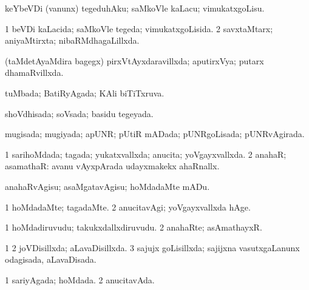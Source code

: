{\bentry
{} 
\gl{\sakirx}
\expl{}
\bmng
 keYbeVDi (\mo vanunx) tegeduhAku; saMkoVle kaLacu; vimukatxgoLisu. 
\emng
\eentry

\bentry
{} 
\gl{\gu}
\expl{}
\bmng
\bnum
\num{1} beVDi kaLacida; saMkoVle tegeda; vimukatxgoLisida. 
\num{2} savxtaMtarx; aniyaMtirxta; nibaRMdhagaLillxda. 
\enum
\emng
\eentry

\bentry
{} 
\gl{\gu}
\expl{}
\bmng
 (taMdetAyaMdira bagegx) pirxVtAyxdaravillxda; aputirxVya; putarx dhamaRvillxda. 
\emng
\eentry

\bentry
{} 
\gl{\gu}
\expl{}
\bmng
 tuMbada; BatiRyAgada; KAli biTiTxruva. 
\emng
\eentry

\bentry
{} 
\gl{\gu}
\expl{}
\bmng
 shoVdhisada; soVsada; basidu tegeyada. 
\emng
\eentry

\bentry
{} 
\gl{\gu}
\expl{}
\bmng
mugisada; mugiyada; apUNR; pUtiR mADada; pUNRgoLisada; pUNRvAgirada. 
\emng
\eentry

\bentry
{} 
\gl{\gu}
\expl{}
\bmng
\bnum
\num{1} sarihoMdada; tagada; yukatxvallxda; anucita; yoVgayxvallxda. 
\num{2} anahaR; asamathaR:  avanu vAyxpArada udayxmakekx ahaRnallx. 
\enum
\emng
\eentry

\bentry
{} 
\gl{\sakirx}
\bmng
anahaRvAgisu; asaMgatavAgisu; hoMdadaMte mADu. 
\emng
\eentry

\bentry
{} 
\gl{\kirxvi}
\bmng
\bnum
\num{1} hoMdadaMte; tagadaMte. 
\num{2} anucitavAgi; yoVgayxvallxda hAge. 
\enum
\emng
\eentry

\bentry
{} 
\gl{\nA}
\expl{}
\bmng
\bnum
\num{1} hoMdadiruvudu; takukxdallxdiruvudu. 
\num{2} anahaRte; asAmathayxR. 
\enum
\emng
\eentry

\bentry
{} 
 \gl{\gu} \bmng
\bnum
\num{1}  
\num{2} joVDisillxda; aLavaDisillxda. 
\num{3} sajujx goLisillxda; sajijxna vasutxgaLanunx odagisada, aLavaDisada. 
\enum
\emng
\eentry

\bentry
{} 
\gl{\gu}
\expl{}
\bmng
\bnum
\num{1} sariyAgada; hoMdada. 
\num{2} anucitavAda. 
\enum
\emng
\eentry

}
